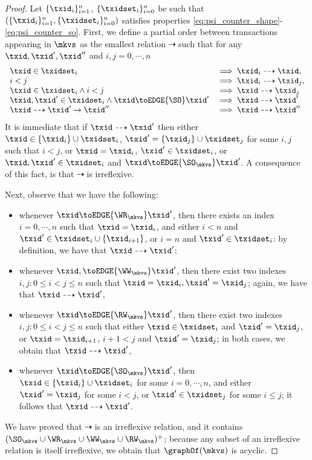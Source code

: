 \begin{proof}
Let $\{\txid_{i}\}_{i=1}^{n}$, $\{\txidset_{i}\}_{i=0}^{n}$ 
be such that $(\{\txid_{i}\}_{i=1}^{n}, \{\txidset_{i}\}_{i=0}^{n})$ 
satisfies properties \eqref{eq:psi_counter_shape}-\eqref{eq:psi_counter_so}. 
First, we define a partial order between transactions appearing in $\mkvs$ 
as the smallest relation $\dashrightarrow$ such that for any $\txid, \txid', \txid''$ and 
$i,j = 0,\cdots, n$
\[
\begin{array}{ll}
\txid \in \txidset_{i} &\implies \txid_{i} \dashrightarrow \txid,\\
i < j &\implies \txid_{i} \dashrightarrow \txid_{j},\\
\txid \in \txidset_{i} \wedge i < j & \implies \txid \dashrightarrow \txid_{j}\\
\txid, \txid' \in \txidset_{i} \wedge \txid \toEDGE{\SO} \txid' &\implies \txid \dashrightarrow \txid'\\
\txid \dashrightarrow \txid' \rightarrow \txid'' &\implies \txid \dashrightarrow \txid''
\end{array}
\]
It is immediate that if $\txid \dashrightarrow \txid'$ then either $\txid \in \{\txid_{i}\} \cup \txidset_i$, 
$\txid' = \{\txid_{j}\} \cup \txidset_{j}$ for some $i,j$ such that $i < j$, or $\txid = \txid_{i}$, $\txid' \in \txidset_i$, 
or $\txid, \txid' \in \txidset_{i}$ and $\txid \toEDGE{\SO_{\mkvs}} \txid'$. A consequence of this fact, 
is that $\dashrightarrow$ is irreflexive.

Next, observe that we have the following: 
\begin{itemize}
\item whenever $\txid \toEDGE{\WR_{\mkvs}} \txid'$, then 
there exists an index $i = 0,\cdots, n$ such that $\txid = \txid_{i}$, 
and either $i < n$ and $\txid' \in \txidset_{i} \cup \{ \txid_{i+1} \}$, 
or $i = n$ and $\txid' \in \txidset_{i}$: by definition, we have that $\txid \dashrightarrow \txid'$;
\item whenever $\txid, \toEDGE{\WW_{\mkvs}} \txid'$, 
then there exist two indexes $i, j: 0 \leq i < j \leq n$ such that 
$\txid = \txid_{i}, \txid' = \txid_{j}$; again, we have that $\txid \dashrightarrow \txid'$, 
\item whenever $\txid \toEDGE{\RW_{\mkvs}} \txid'$, then 
there exist two indexes $i, j: 0 \leq i < j \leq n$ such that either 
$\txid \in \txidset_{i}$ and $\txid' = \txid_{j}$, or $\txid = \txid_{i+1}$, 
$i+1 < j$ and $\txid' = \txid_{j}$; in both cases, we obtain that $\txid \dashrightarrow \txid'$,
\item whenever $\txid \toEDGE{\SO_{\mkvs}} \txid'$, then 
$\txid \in \{\txid_{i}\} \cup \txidset_{i}$ for some $i=0,\cdots,n$, 
and either $\txid' = \txid_{j}$ for some $i < j$,  or $\txid' \in \txidset_{j}$ for 
some $i \leq j$; it follows that $\txid \dashrightarrow \txid'$.
\end{itemize}

We have proved that $\dashrightarrow$ is an irreflexive relation, and it contains $(\SO_{\mkvs} \cup \WR_{\mkvs} \cup \WW_{\mkvs} \cup \RW_{\mkvs})^+$; 
because any subset of an irreflexive relation is itself irreflexive, we obtain that $\graphOf(\mkvs)$ is acyclic.
\end{proof}


